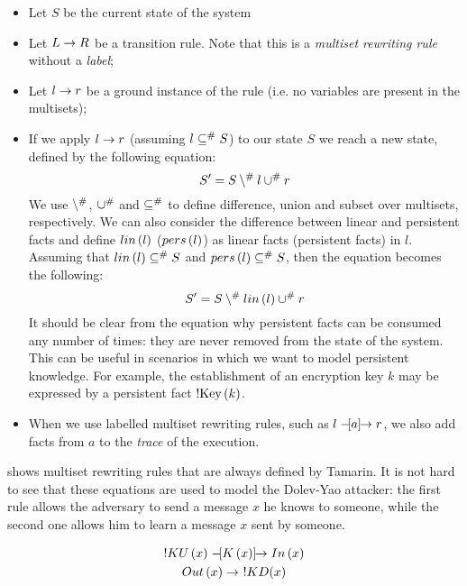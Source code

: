 \begin{itemize}
    \item{Let $S$ be the current state of the system}
    \item{Let $L \rightarrow R$ be a transition rule. Note that this is a \textit{multiset rewriting rule} without a \textit{label};}
    \item{Let $l \rightarrow r$ be a ground instance of the rule (i.e. no variables are present in the multisets);}
    \item{If we apply $l \rightarrow r$ (assuming $l \subseteq^\# S$) to our state $S$ we reach a new state, defined by the following equation:
                \begin{equation}
                    S' = S \setminus^\# l \cup^\# r
                \end{equation}
                We use $\setminus^\#$, $\cup^\#$ and $\subseteq^\#$ to define difference, union and subset over multisets, respectively. We can also consider the difference between linear and persistent facts and define $lin\left(l\right)$ ($pers\left(l\right)$) as linear facts (persistent facts) in $l$. Assuming that $lin\left(l\right) \subseteq^\# S$ and $pers\left(l\right) \subseteq^\# S$, then the equation becomes the following:
                \begin{equation}
                    S' = S \setminus^\# lin\left(l\right) \cup^\# r
                \end{equation}
                It should be clear from the equation why persistent facts can be consumed any number of times: they are never removed from the state of the system. This can be useful in scenarios in which we want to model persistent knowledge. For example, the establishment of an encryption key $k$ may be expressed by a persistent fact $\mbox{!Key}\left(k\right)$.
          }
    \item{When we use labelled multiset rewriting rules, such as $l \mathrel{-\hspace{-2pt}[a]\hspace{-4pt}\to} r$, we also add facts from $a$ to the \textit{trace} of the execution.}
\end{itemize}

 shows multiset rewriting rules that are always defined by Tamarin. It is not hard to see that these equations are used to model the Dolev-Yao attacker: the first rule allows the adversary to send a message $x$ he knows to someone, while the second one allows him to learn a message $x$ sent by someone.

\begin{equation}
    \label{eq:built-in-tamarin-msr-rules}
    \begin{gathered}
        !KU\left(x\right) \mathrel{-\hspace{-2pt}[K\left(x\right)]\hspace{-4pt}\to} In\left(x\right)\\
        Out\left(x\right) \rightarrow \ !KD(x)
    \end{gathered}
\end{equation}


